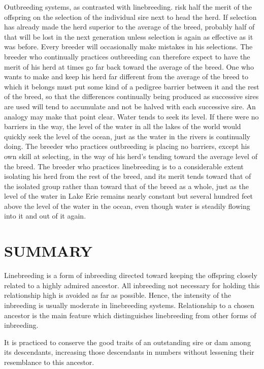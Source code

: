 Outbreeding systems, as contrasted with linebreeding. risk half the
merit of the offspring on the selection of the individual sire next to
head the herd. If selection has already made the herd superior to the
average of the breed, probably half of that will be lost in the next generation
unless selection is again as effective as it was before. Every
breeder will occasionally make mistakes in his selections. The breeder
who continually practices outbreeding can therefore expect to have the
merit of his herd at times go far back toward the average of the breed.
One who wants to make and keep his herd far different from the average
of the breed to which it belongs must put some kind of a pedigree
barrier between it and the rest of the breed, so that the differences continually
being produced as successive sires are used will tend to accumulate
and not be halved with each successive sire. An analogy may make
that point clear. Water tends to seek its level. If there were no barriers
in the way, the level of the water in all the lakes of the world would
quickly seek the level of the ocean, just as the water in the rivers is
continually doing. The breeder who practices outbreeding is placing
no barriers, except his own skill at selecting, in the way of his herd's
tending toward the average level of the breed. The breeder who practices
linebreeding is to a considerable extent isolating his herd from
the rest of the breed, and its merit tends toward that of the isolated
group rather than toward that of the breed as a whole, just as the level
of the water in Lake Erie remains nearly constant but several hundred
feet above the level of the water in the ocean, even though water is
steadily flowing into it and out of it again.

\section*{SUMMARY}

Linebreeding is a form of inbreeding directed toward keeping the
offspring closely related to a highly admired ancestor. All inbreeding
not necessary for holding this relationship high is avoided as far as possible.
Hence, the intensity of the inbreeding is usually moderate in
linebreeding systems. Relationship to a chosen ancestor is the main
feature which distinguishes linebreeding from other forms of
inbreeding.

It is practiced to conserve the good traits of an outstanding sire or
dam among its descendants, increasing those descendants in numbers
without lessening their resemblance to this ancestor.

